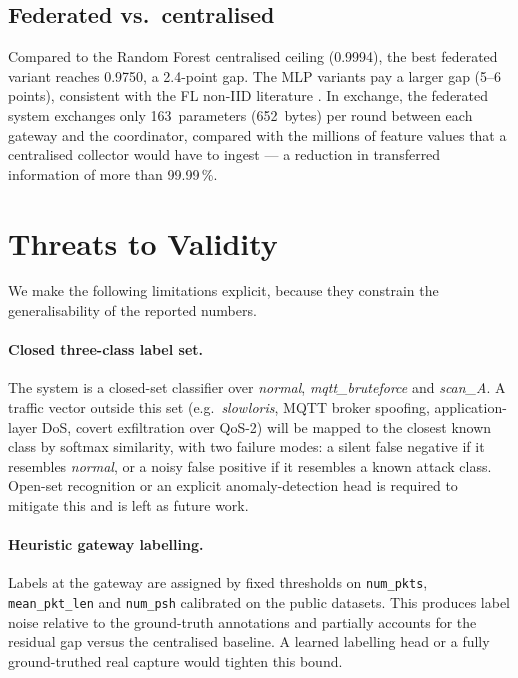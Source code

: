 \documentclass[runningheads]{llncs}
\begin{document}
\subsection{Federated vs.\ centralised}

Compared to the Random Forest centralised ceiling (0.9994), the best
federated variant reaches 0.9750, a 2.4-point gap. The MLP variants pay a
larger gap (5--6 points), consistent with the FL non-IID literature
\cite{imteaj2022survey,albanbay2025}. In exchange, the federated system
exchanges only 163~parameters (652~bytes) per round between each gateway
and the coordinator, compared with the millions of feature values that a
centralised collector would have to ingest --- a reduction in transferred
information of more than 99.99\,\%.

\section{Threats to Validity}
\label{sec:threats}

We make the following limitations explicit, because they constrain the
generalisability of the reported numbers.

\paragraph{Closed three-class label set.}
The system is a closed-set classifier over \emph{normal},
\emph{mqtt\_bruteforce} and \emph{scan\_A}. A traffic vector outside this
set (e.g.\ \emph{slowloris}, MQTT broker spoofing, application-layer DoS,
covert exfiltration over QoS-2) will be mapped to the closest known class
by softmax similarity, with two failure modes: a silent false negative if
it resembles \emph{normal}, or a noisy false positive if it resembles a
known attack class. Open-set recognition or an explicit anomaly-detection
head is required to mitigate this and is left as future work.

\paragraph{Heuristic gateway labelling.}
Labels at the gateway are assigned by fixed thresholds on
\texttt{num\_pkts}, \texttt{mean\_pkt\_len} and \texttt{num\_psh}
calibrated on the public datasets. This produces label noise relative to
the ground-truth annotations and partially accounts for the residual gap
versus the centralised baseline. A learned labelling head or a fully
ground-truthed real capture would tighten this bound.
\end{document}
